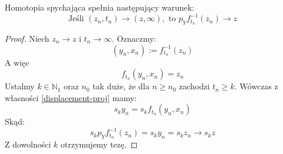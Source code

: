 \begin{prop}
  Homotopia spychająca spełnia następujący warunek:
  \[\mbox{Jeśli }	(z_n, t_n) \rightarrow (z, \infty), \mbox{ to } p_Y f_{t_n}^{-1}(z_n) \rightarrow z\]
  \begin{proof}
    Niech $z_n \rightarrow z$ i $t_n \rightarrow \infty$. Oznaczmy:
    \[(y_n, x_n) := f_{t_n}^{-1}(z_n)\]
    A więc
    \[f_{t_n}(y_n, x_n) = z_n\]
    Ustalmy $k \in \mathbb{N}_1$ oraz $n_0$ tak duże, że dla $n \geq n_0$ zachodzi $t_n \geq k$. Wówczas z własności \ref{displacement-proj} mamy:
    \[s_k y_n = s_k f_{t_n}(y_n, x_n)\]
    Skąd:
    \[s_k p_Y f_{t_n}^{-1}(z_n) = s_k y_n = s_k z_n \rightarrow s_k z\]
    Z dowolności $k$ otrzymujemy tezę.
  \end{proof}
\end{prop}


